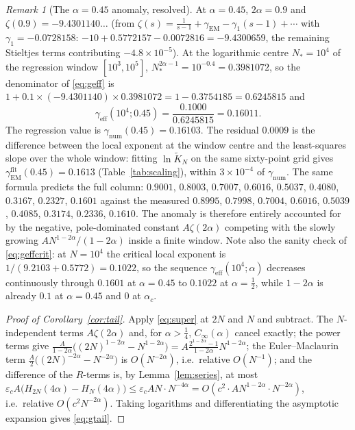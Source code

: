 \documentclass[11pt,reqno]{amsart}
\theoremstyle{plain}
\theoremstyle{definition}
\theoremstyle{remark}
\newtheorem{remark}[theorem]{Remark}
\numberwithin{equation}{section}
\newcommand{\gEM}{\gamma_{\mathrm{EM}}}
\newcommand{\gnum}{\gamma_{\mathrm{num}}}
\newcommand{\geff}{\gamma_{\mathrm{eff}}}
\begin{document}
\begin{remark}[The $\alpha=0.45$ anomaly, resolved]\label{rem:045}
At $\alpha=0.45$, $2\alpha=0.9$ and $\zeta(0.9)=-9.4301140\ldots$ (from $\zeta(s)=\frac1{s-1}+\gamma_{\mathrm{EM}}-\gamma_1(s-1)+\cdots$ with $\gamma_1=-0.0728158$: $-10+0.5772157-0.0072816=-9.4300659$, the remaining Stieltjes terms contributing $-4.8\times10^{-5}$). At the logarithmic centre $N_*=10^4$ of the regression window $[10^3,10^5]$, $N_*^{2\alpha-1}=10^{-0.4}=0.3981072$, so the denominator of \eqref{eq:geff} is $1+0.1\times(-9.4301140)\times0.3981072=1-0.3754185=0.6245815$ and
\[
\geff(10^4;0.45)=\frac{0.1000}{0.6245815}=0.16011 .
\]
The regression value is $\gnum(0.45)=0.16103$. The residual $0.0009$ is the difference between the local exponent at the window centre and the least-squares slope over the whole window: fitting $\ln\widetilde K_N$ on the same sixty-point grid gives $\gEM^{\mathrm{fit}}(0.45)=0.1613$ (Table~\ref{tab:scaling}), within $3\times10^{-4}$ of $\gnum$. The same formula predicts the full column: $0.9001$, $0.8003$, $0.7007$, $0.6016$, $0.5037$, $0.4080$, $0.3167$, $0.2327$, $0.1601$ against the measured $0.8995$, $0.7998$, $0.7004$, $0.6016$, $0.5039$, $0.4085$, $0.3174$, $0.2336$, $0.1610$. The anomaly is therefore entirely accounted for by the negative, pole-dominated constant $A\zeta(2\alpha)$ competing with the slowly growing $AN^{1-2\alpha}/(1-2\alpha)$ inside a finite window. Note also the sanity check of \eqref{eq:geffcrit}: at $N=10^4$ the critical local exponent is $1/(9.2103+0.5772)=0.1022$, so the sequence $\geff(10^4;\alpha)$ decreases continuously through $0.1601$ at $\alpha=0.45$ to $0.1022$ at $\alpha=\frac12$, while $1-2\alpha$ is already $0.1$ at $\alpha=0.45$ and $0$ at $\alpha_c$.
\end{remark}

\begin{proof}[Proof of Corollary~\ref{cor:tail}]
Apply \eqref{eq:super} at $2N$ and $N$ and subtract. The $N$-independent terms $A\zeta(2\alpha)$ and, for $\alpha>\frac14$, $C_\infty(\alpha)$ cancel exactly; the power terms give $\frac A{1-2\alpha}\bigl((2N)^{1-2\alpha}-N^{1-2\alpha}\bigr)=A\frac{2^{1-2\alpha}-1}{1-2\alpha}N^{1-2\alpha}$; the Euler--Maclaurin term $\frac A2\bigl((2N)^{-2\alpha}-N^{-2\alpha}\bigr)$ is $O(N^{-2\alpha})$, i.e.\ relative $O(N^{-1})$; and the difference of the $R$-terms is, by Lemma~\ref{lem:series}, at most $\varepsilon_cA\bigl(H_{2N}(4\alpha)-H_N(4\alpha)\bigr)\le\varepsilon_cAN\cdot N^{-4\alpha}=O(c^2\cdot AN^{1-2\alpha}\cdot N^{-2\alpha})$, i.e.\ relative $O(c^2N^{-2\alpha})$. Taking logarithms and differentiating the asymptotic expansion gives \eqref{eq:gtail}.
\end{proof}
\end{document}
